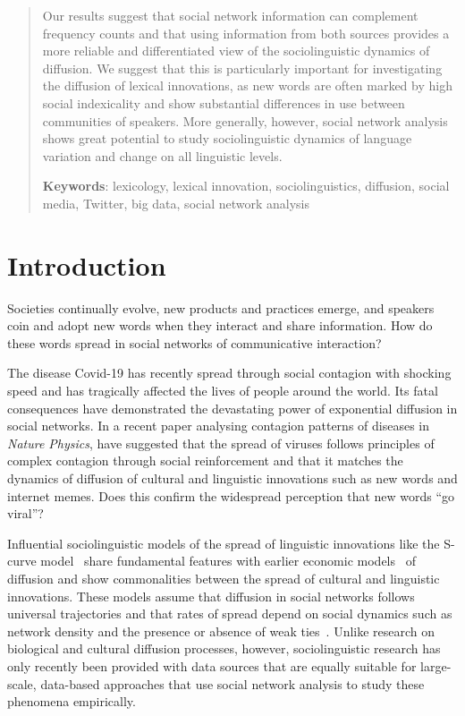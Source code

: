 \documentclass[a4paper, abstract=on]{scrartcl}
\begin{document}
\begin{abstract}
    Our results suggest that social network information can complement frequency counts and that using information from both sources provides a more reliable and differentiated view of the sociolinguistic dynamics of diffusion. We suggest that this is particularly important for investigating the diffusion of lexical innovations, as new words are often marked by high social indexicality and show substantial differences in use between communities of speakers. More generally, however, social network analysis shows great potential to study sociolinguistic dynamics of language variation and change on all linguistic levels.


    \vspace{2\baselineskip}

    \textbf{Keywords}: lexicology, lexical innovation, sociolinguistics, diffusion, social media, Twitter, big data, social network analysis

  \end{abstract}


\section{Introduction}

  Societies continually evolve, new products and practices emerge, and speakers coin and adopt new words when they interact and share information. How do these words spread in social networks of communicative interaction?

  The disease Covid-19 has recently spread through social contagion with shocking speed and has tragically affected the lives of people around the world. Its fatal consequences have demonstrated the devastating power of exponential diffusion in social networks. In a recent paper analysing contagion patterns of diseases in \emph{Nature Physics}, \textcite{Hebert-Dufresne2020} have suggested that the spread of viruses follows principles of complex contagion through social reinforcement and that it matches the dynamics of diffusion of cultural and linguistic innovations such as new words and internet memes. Does this confirm the widespread perception that new words \enquote{go viral}?

  Influential sociolinguistic models of the spread of linguistic innovations like the S-curve model~\parencite{Milroy1992} share fundamental features with earlier economic models~\parencite{Rogers1962} of diffusion and show commonalities between the spread of cultural and linguistic innovations. These models assume that diffusion in social networks follows universal trajectories and that rates of spread depend on social dynamics such as network density and the presence or absence of weak ties~\parencite{Granovetter1977}. Unlike research on biological and cultural diffusion processes, however, sociolinguistic research has only recently been provided with data sources that are equally suitable for large-scale, data-based approaches that use social network analysis to study these phenomena empirically.
\end{document}
